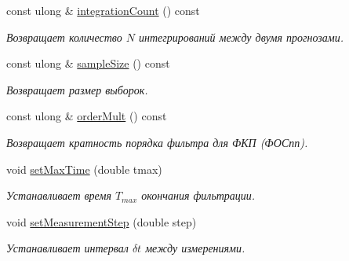 \begin{DoxyCompactItemize}
\hypertarget{class_core_1_1_filter_parameters_a7471b7b91b3b3388c3ee29d679279c1b}{}\label{class_core_1_1_filter_parameters_a7471b7b91b3b3388c3ee29d679279c1b} 
const ulong \& \hyperlink{class_core_1_1_filter_parameters_a7471b7b91b3b3388c3ee29d679279c1b}{integration\+Count} () const
\begin{DoxyCompactList}\small\item\em Возвращает количество $N$ интегрирований между двумя прогнозами. \end{DoxyCompactList}\item 
\hypertarget{class_core_1_1_filter_parameters_a93198cf1f29d223fb645be16e91a52fe}{}\label{class_core_1_1_filter_parameters_a93198cf1f29d223fb645be16e91a52fe} 
const ulong \& \hyperlink{class_core_1_1_filter_parameters_a93198cf1f29d223fb645be16e91a52fe}{sample\+Size} () const
\begin{DoxyCompactList}\small\item\em Возвращает размер выборок. \end{DoxyCompactList}\item 
\hypertarget{class_core_1_1_filter_parameters_a391dbabccc9b3ab8134789eaac8c15c4}{}\label{class_core_1_1_filter_parameters_a391dbabccc9b3ab8134789eaac8c15c4} 
const ulong \& \hyperlink{class_core_1_1_filter_parameters_a391dbabccc9b3ab8134789eaac8c15c4}{order\+Mult} () const
\begin{DoxyCompactList}\small\item\em Возвращает кратность порядка фильтра для ФКП (ФОСпп). \end{DoxyCompactList}\item 
\hypertarget{class_core_1_1_filter_parameters_a649fb04817a251986e9bffb264b3a22a}{}\label{class_core_1_1_filter_parameters_a649fb04817a251986e9bffb264b3a22a} 
void \hyperlink{class_core_1_1_filter_parameters_a649fb04817a251986e9bffb264b3a22a}{set\+Max\+Time} (double tmax)
\begin{DoxyCompactList}\small\item\em Устанавливает время $T_{max}$ окончания фильтрации. \end{DoxyCompactList}\item 
\hypertarget{class_core_1_1_filter_parameters_a53a29d979978514b85078f3d7263c947}{}\label{class_core_1_1_filter_parameters_a53a29d979978514b85078f3d7263c947} 
void \hyperlink{class_core_1_1_filter_parameters_a53a29d979978514b85078f3d7263c947}{set\+Measurement\+Step} (double step)
\begin{DoxyCompactList}\small\item\em Устанавливает интервал $\delta t$ между измерениями. \end{DoxyCompactList}\item 

\end{DoxyCompactItemize}
